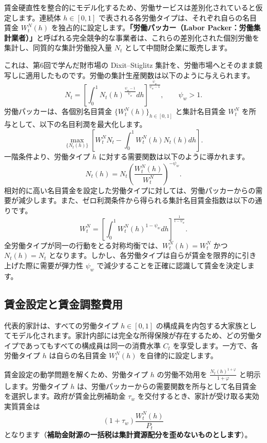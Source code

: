 \documentclass[
  japanese,
  lualatex,
  ja=standard,
  12pt,
  a4paper]{ltjsarticle}
\begin{document}
賃金硬直性を整合的にモデル化するため、労働サービスは差別化されていると仮定します。連続体
\(h\in[0,1]\) で表される各労働タイプは、それぞれ自らの名目賃金
\(W_t^N(h)\) を独占的に設定します。\textbf{「労働パッカー（Labor
Packer：労働集計業者）」}と呼ばれる完全競争的な事業者は、これらの差別化された個別労働を集計し、同質的な集計労働投入量
\(N_t\) として中間財企業に販売します。

これは、第6回で学んだ財市場の Dixit--Stiglitz
集計を、労働市場へとそのまま鏡写しに適用したものです。労働の集計生産関数は以下のように与えられます。
\[
N_t
=
\left[
\int_0^1
N_t(h)^{\frac{\psi_w-1}{\psi_w}}dh
\right]^{\frac{\psi_w}{\psi_w-1}},
\qquad
\psi_w>1.
\] 労働パッカーは、各個別名目賃金 \(\{W_t^N(h)\}_{h\in[0,1]}\)
と集計名目賃金 \(W_t^N\) を所与として、以下の名目利潤を最大化します。 \[
\max_{\{N_t(h)\}} \left[ W_t^N N_t-\int_0^1 W_t^N(h)N_t(h)dh \right].
\] 一階条件より、労働タイプ \(h\)
に対する需要関数は以下のように導かれます。 \[
N_t(h)
=
N_t
\left(
\frac{W_t^N(h)}{W_t^N}
\right)^{-\psi_w}.
\]
相対的に高い名目賃金を設定した労働タイプに対しては、労働パッカーからの需要が減少します。また、ゼロ利潤条件から得られる集計名目賃金指数は以下の通りです。
\[
W_t^N
=
\left[
\int_0^1
W_t^N(h)^{1-\psi_w}dh
\right]^{\frac{1}{1-\psi_w}}.
\] 全労働タイプが同一の行動をとる対称均衡では、\(W_t^N(h)=W_t^N\) かつ
\(N_t(h)=N_t\)
となります。しかし、各労働タイプは自らが賃金を限界的に引き上げた際に需要が弾力性
\(\psi_w\) で減少することを正確に認識して賃金を決定します。

\subsection{賃金設定と賃金調整費用}\label{ux8cc3ux91d1ux8a2dux5b9aux3068ux8cc3ux91d1ux8abfux6574ux8cbbux7528}

代表的家計は、すべての労働タイプ \(h\in[0,1]\)
の構成員を内包する大家族としてモデル化されます。家計内部には完全な所得保険が存在するため、どの労働タイプであってもすべての構成員は同一の消費水準
\(C_t\) を享受します。一方で、各労働タイプ \(h\) は自らの名目賃金
\(W_t^N(h)\) を自律的に設定します。

賃金設定の動学問題を解くため、労働タイプ \(h\) の労働不効用を
\(\frac{N_t(h)^{1+\varphi}}{1+\varphi}\) と明示します。労働タイプ \(h\)
は、労働パッカーからの需要関数を所与として名目賃金を選択します。政府が賃金比例補助金
\(\tau_w\) を交付するとき、家計が受け取る実効実質賃金は \[
(1+\tau_w)\frac{W_t^N(h)}{P_t}
\]
となります（\textbf{補助金財源の一括税は集計資源配分を歪めないものとします}）。
\end{document}
